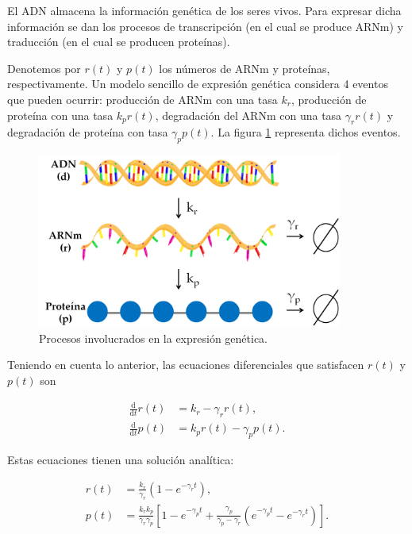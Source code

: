 \documentclass[11pt,letterpaper]{exam}
\begin{document}
\begin{questions}

El ADN almacena la informaci\'on gen\'etica de los seres vivos. Para
expresar dicha informaci\'on se dan los procesos de transcripci\'on
(en el cual se produce ARNm) y traducci\'on (en el cual se producen
prote\'inas).   

Denotemos por $r(t)$ y $p(t)$ los n\'umeros de ARNm y prote\'inas,
respectivamente. Un modelo sencillo de expresi\'on gen\'etica
considera 4 eventos que pueden ocurrir: producci\'on de ARNm con una
tasa $k_r$, producci\'on de prote\'ina con una tasa $k_p r(t)$,
degradaci\'on del ARNm con una tasa $\gamma_rr(t)$ y degradaci\'on de
prote\'ina con tasa $\gamma_pp(t)$. La figura \ref{fig:con-dogma}
representa dichos eventos. 

\begin{figure}[H]
  \centering
  \includegraphics[width=10cm]{Pmas-dogma}
  \caption{\label{fig:con-dogma} Procesos involucrados en la expresi\'on gen\'etica.}
\end{figure}

Teniendo en cuenta lo anterior, las ecuaciones diferenciales que
satisfacen $r(t)$ y $p(t)$ son 

\begin{equation}
\label{eq:dif}
\begin{split}
\frac{\mathrm{d}}{\mathrm{d}t}r(t) &= k_r - \gamma_r r(t),\\
\frac{\mathrm{d}}{\mathrm{d}t}p(t) &= k_pr(t) - \gamma_p p(t).
\end{split}
\end{equation}

Estas ecuaciones tienen una soluci\'on anal\'itica:


\begin{equation}
\label{eq:det}
\begin{split}
r(t) &= \frac{k_r}{\gamma_r}\left(1-e^{-\gamma_rt}\right),\\
p(t) &= \frac{k_rk_p}{\gamma_r\gamma_p}\left[1-e^{-\gamma_pt}+\frac{\gamma_p}{\gamma_p-\gamma_r}\left(e^{-\gamma_pt}-e^{-\gamma_rt}\right)\right].
\end{split}
\end{equation} 


\end{questions}
\end{document}
